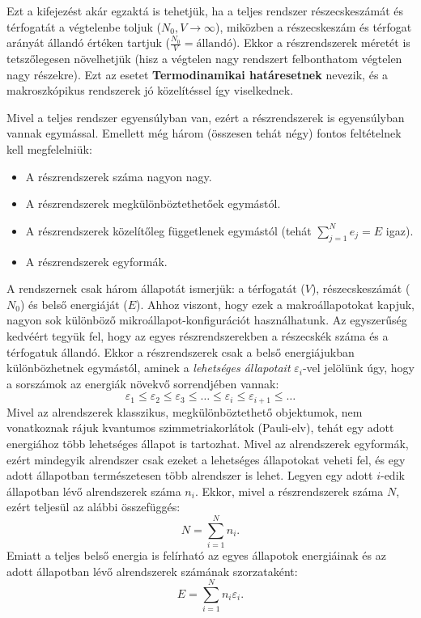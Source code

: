 \documentclass[../main.tex]{subfiles}
\begin{document}
Ezt a kifejezést akár egzaktá is tehetjük, ha a teljes rendszer részecskeszámát és térfogatát a végtelenbe toljuk ($N_0, V \to \infty$), miközben a részecskeszám és térfogat arányát állandó értéken tartjuk ($\frac{N_0}{V} = \text{állandó}$).
Ekkor a részrendszerek méretét is tetszőlegesen növelhetjük (hisz a végtelen nagy rendszert felbonthatom végtelen nagy részekre). Ezt az esetet \textbf{Termodinamikai határesetnek} nevezik,
és a makroszkópikus rendszerek jó közelítéssel így viselkednek.

Mivel a teljes rendszer egyensúlyban van, ezért a részrendszerek is egyensúlyban vannak egymással. Emellett még három (összesen tehát négy) fontos feltételnek kell megfelelniük:
\begin{itemize}
    \item A részrendszerek száma nagyon nagy.
    \item A részrendszerek megkülönböztethetőek egymástól.
    \item A részrendszerek közelítőleg függetlenek egymástól (tehát $\sum_{j = 1}^{N} e_j = E$ igaz).
    \item A részrendszerek egyformák.
\end{itemize}

A rendszernek csak három állapotát ismerjük: a térfogatát ($V$), részecskeszámát ($N_0$) és belső energiáját ($E$). Ahhoz viszont, hogy ezek a makroállapotokat kapjuk, 
nagyon sok különböző mikroállapot-konfigurációt használhatunk. Az egyszerűség kedvéért tegyük fel, hogy az egyes részrendszerekben a részecskék száma és a térfogatuk állandó.
Ekkor a részrendszerek csak a belső energiájukban különbözhetnek egymástól, aminek a \textit{lehetséges állapotait} $\varepsilon_i$-vel jelölünk úgy, hogy a sorszámok az energiák növekvő sorrendjében vannak:
\begin{equation}
    \varepsilon_1 \leq \varepsilon_2 \leq \varepsilon_3 \leq \ldots \leq \varepsilon_i \leq \varepsilon_{i+1} \leq \ldots
\end{equation}
Mivel az alrendszerek klasszikus, megkülönböztethető objektumok, nem vonatkoznak rájuk kvantumos szimmetriakorlátok (Pauli-elv), tehát egy adott energiához több lehetséges állapot is tartozhat. Mivel az alrendszerek egyformák,
ezért mindegyik alrendszer csak ezeket a lehetséges állapotokat veheti fel, és egy adott állapotban természetesen több alrendszer is lehet. Legyen egy adott $i$-edik állapotban lévő alrendszerek száma $n_i$.
Ekkor, mivel a részrendszerek száma $N$, ezért teljesül az alábbi összefüggés:
\begin{equation}
    N = \sum_{i = 1}^N n_i.
\end{equation}
Emiatt a teljes belső energia is felírható az egyes állapotok energiáinak és az adott állapotban lévő alrendszerek számának szorzataként:
\begin{equation}
    E = \sum_{i = 1}^N n_i \varepsilon_i.
\end{equation}
\end{document}
